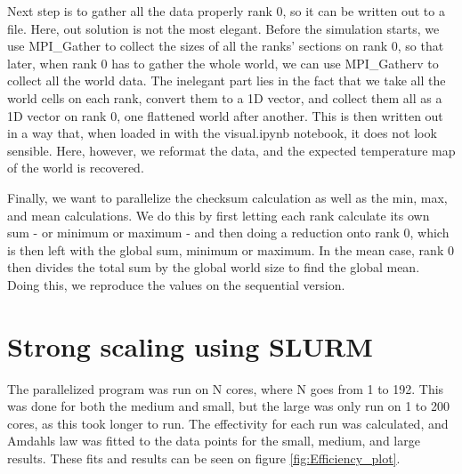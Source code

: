 \documentclass{article}
\begin{document}
Next step is to gather all the data properly rank 0, so it can be written out to a file. Here, out solution is not the most elegant. Before the simulation starts, we use MPI\_Gather to collect the sizes of all the ranks' sections on rank 0, so that later, when rank 0 has to gather the whole world, we can use MPI\_Gatherv to collect all the world data. The inelegant part lies in the fact that we take all the world cells on each rank, convert them to a 1D vector, and collect them all as a 1D vector on rank 0, one flattened world after another. This is then written out in a way that, when loaded in with the visual.ipynb notebook, it does not look sensible. Here, however, we reformat the data, and the expected temperature map of the world is recovered. 

Finally, we want to parallelize the checksum calculation as well as the min, max, and mean calculations. We do this by first letting each rank calculate its own sum - or minimum or maximum - and then doing a reduction onto rank 0, which is then left with the global sum, minimum or maximum. In the mean case, rank 0 then divides the total sum by the global world size to find the global mean. Doing this, we reproduce the values on the sequential version.


\section{Strong scaling using SLURM}
The parallelized program was run on N cores, where N goes from 1 to 192. This was done for both the medium and small, but the large was only run on 1 to 200 cores, as this took longer to run. The effectivity for each run was calculated, and Amdahls law was fitted to the data points for the small, medium, and large results.
These fits and results can be seen on figure \ref{fig:Efficiency_plot}. 
\end{document}
